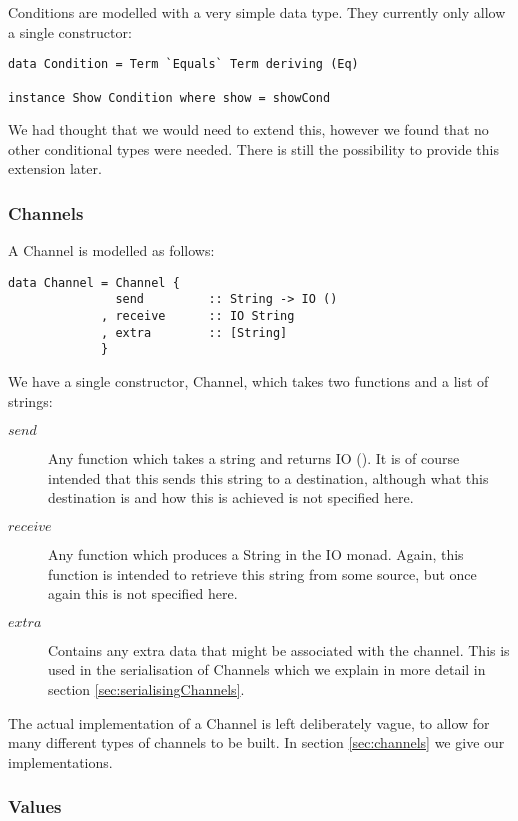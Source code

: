 \begin{description}
Conditions are modelled with a very simple data type. They currently only allow a single constructor:

\begin{verbatim}
data Condition = Term `Equals` Term deriving (Eq)

instance Show Condition where show = showCond
\end{verbatim}

We had thought that we would need to extend this, however we found that no other conditional types were needed. There is still the possibility to provide this extension later.

\subsubsection{Channels}

A Channel is modelled as follows:

\begin{verbatim}
data Channel = Channel {
               send         :: String -> IO ()
             , receive      :: IO String
             , extra        :: [String]
             }
\end{verbatim}

We have a single constructor, Channel, which takes two functions and a list of strings:
\begin{description}
    \item[$send$] Any function which takes a string and returns IO (). It is of course intended that this sends this string to a destination, although what this destination is and how this is achieved is not specified here.
    \item[$receive$] Any function which produces a String in the IO monad. Again, this function is intended to retrieve this string from some source, but once again this is not specified here.
    \item[$extra$] Contains any extra data that might be associated with the channel. This is used in the serialisation of Channels which we explain in more detail in section \ref{sec:serialisingChannels}.
\end{description}

The actual implementation of a Channel is left deliberately vague, to allow for many different types of channels to be built. In section \ref{sec:channels} we give our implementations.

\subsubsection{Values}


\end{description}
